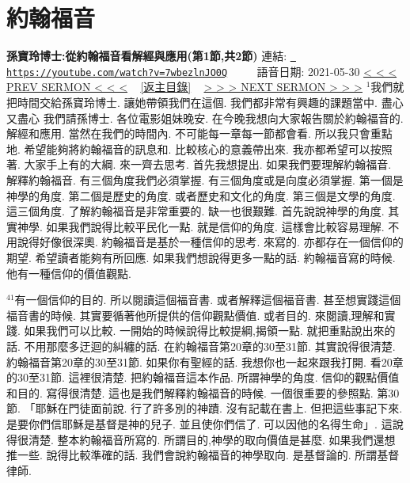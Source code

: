 \documentclass{book}
\begin{document}
\section{約翰福音}
\label{sec:7wbezlnJO0Q}
\textbf{孫寶玲博士:從約翰福音看解經與應用(第1節,共2節)}
\newline
\newline
連結: \href{https://youtube.com/watch?v=7wbezlnJO0Q}{\texttt{ https://youtube.com/watch?v=7wbezlnJO0Q}} ~~~~ 語音日期: 2021-05-30 
\newline
\newline
\hyperref[sec:kGnhU90Nb7o]{\small{< < < PREV SERMON < < <}}
~
\hyperref[sec:index]{\small{[返主目錄]}}
~
\hyperref[sec:tuRWhEkvI_Q]{\small{> > > NEXT SERMON > > >}}
\newline
\newline
$^{1}$我們就把時間交給孫寶玲博士.
讓她帶領我們在這個.
我們都非常有興趣的課題當中.
盡心又盡心 我們請孫博士.
各位電影姐妹晚安.
在今晚我想向大家報告關於約翰福音的.
解經和應用.
當然在我們的時間內.
不可能每一章每一節都會看.
所以我只會重點地.
希望能夠將約翰福音的訊息和.
比較核心的意義帶出來.
我亦都希望可以按照著.
大家手上有的大綱.
來一齊去思考.
首先我想提出.
如果我們要理解約翰福音.
解釋約翰福音.
有三個角度我們必須掌握.
有三個角度或是向度必須掌握.
第一個是神學的角度.
第二個是歷史的角度.
或者歷史和文化的角度.
第三個是文學的角度.
這三個角度.
了解約翰福音是非常重要的.
缺一也很艱難.
首先說說神學的角度.
其實神學.
如果我們說得比較平民化一點.
就是信仰的角度.
這樣會比較容易理解.
不用說得好像很深奧.
約翰福音是基於一種信仰的思考.
來寫的.
亦都存在一個信仰的期望.
希望讀者能夠有所回應.
如果我們想說得更多一點的話.
約翰福音寫的時候.
他有一種信仰的價值觀點.

$^{41}$有一個信仰的目的.
所以閱讀這個福音書.
或者解釋這個福音書.
甚至想實踐這個福音書的時候.
其實要循著他所提供的信仰觀點價值.
或者目的.
來閱讀,理解和實踐.
如果我們可以比較.
一開始的時候說得比較提綱,揭領一點.
就把重點說出來的話.
不用那麼多迂迴的糾纏的話.
在約翰福音第20章的30至31節.
其實說得很清楚.
約翰福音第20章的30至31節.
如果你有聖經的話.
我想你也一起來跟我打開.
看20章的30至31節.
這裡很清楚.
把約翰福音這本作品.
所謂神學的角度.
信仰的觀點價值和目的.
寫得很清楚.
這也是我們解釋約翰福音的時候.
一個很重要的參照點.
第30節.
「耶穌在門徒面前說.
行了許多別的神蹟.
沒有記載在書上.
但把這些事記下來.
是要你們信耶穌是基督是神的兒子.
並且使你們信了.
可以因他的名得生命」.
這說得很清楚.
整本約翰福音所寫的.
所謂目的,神學的取向價值是甚麼.
如果我們還想推一些.
說得比較準確的話.
我們會說約翰福音的神學取向.
是基督論的.
所謂基督律師.
\end{document}
